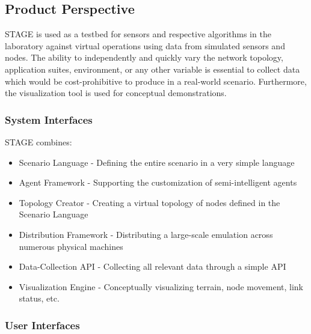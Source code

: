 \documentclass[titlepage]{article}
\begin{document}

\subsection{Product Perspective%
  \label{product-perspective}%
}

STAGE is used as a testbed for sensors and respective algorithms in the laboratory against virtual operations using data from simulated sensors and nodes. The ability to independently and quickly vary the network topology, application suites, environment, or any other variable is essential to collect data which would be cost-prohibitive to produce in a real-world scenario. Furthermore, the visualization tool is used for conceptual demonstrations.


\subsubsection{System Interfaces%
  \label{system-interfaces}%
}

STAGE combines:
\begin{itemize}
    \item Scenario Language - Defining the entire scenario in a very simple language
    \item Agent Framework - Supporting the customization of semi-intelligent agents
    \item Topology Creator - Creating a virtual topology of nodes defined in the Scenario Language
    \item Distribution Framework - Distributing a large-scale emulation across numerous physical machines
    \item Data-Collection API - Collecting all relevant data through a simple API
    \item Visualization Engine - Conceptually visualizing terrain, node movement, link status, etc.
\end{itemize}


\subsubsection{User Interfaces%
  \label{user-interfaces}%
}
\end{document}
